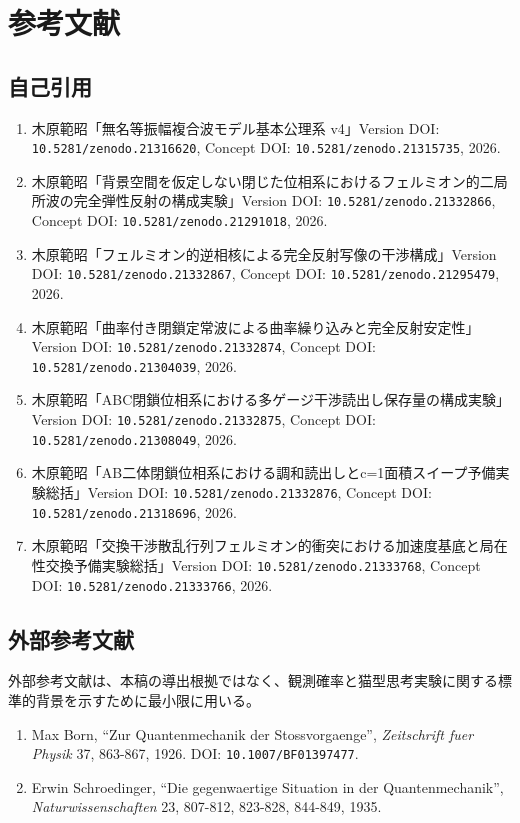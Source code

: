 \documentclass{article}
\providecommand{\tightlist}{\setlength{\itemsep}{0pt}\setlength{\parskip}{0pt}}
\begin{document}
\section{参考文献}\label{ux53c2ux8003ux6587ux732e}

\subsection{自己引用}\label{ux81eaux5df1ux5f15ux7528}

\begin{enumerate}
\def\labelenumi{\arabic{enumi}.}
\tightlist
\item
  木原範昭「無名等振幅複合波モデル基本公理系 v4」Version DOI:
  \texttt{10.5281/zenodo.21316620}, Concept DOI:
  \texttt{10.5281/zenodo.21315735}, 2026.
\item
  木原範昭「背景空間を仮定しない閉じた位相系におけるフェルミオン的二局所波の完全弾性反射の構成実験」Version
  DOI: \texttt{10.5281/zenodo.21332866}, Concept DOI:
  \texttt{10.5281/zenodo.21291018}, 2026.
\item
  木原範昭「フェルミオン的逆相核による完全反射写像の干渉構成」Version
  DOI: \texttt{10.5281/zenodo.21332867}, Concept DOI:
  \texttt{10.5281/zenodo.21295479}, 2026.
\item
  木原範昭「曲率付き閉鎖定常波による曲率繰り込みと完全反射安定性」Version
  DOI: \texttt{10.5281/zenodo.21332874}, Concept DOI:
  \texttt{10.5281/zenodo.21304039}, 2026.
\item
  木原範昭「ABC閉鎖位相系における多ゲージ干渉読出し保存量の構成実験」Version
  DOI: \texttt{10.5281/zenodo.21332875}, Concept DOI:
  \texttt{10.5281/zenodo.21308049}, 2026.
\item
  木原範昭「AB二体閉鎖位相系における調和読出しとc=1面積スイープ予備実験総括」Version
  DOI: \texttt{10.5281/zenodo.21332876}, Concept DOI:
  \texttt{10.5281/zenodo.21318696}, 2026.
\item
  木原範昭「交換干渉散乱行列フェルミオン的衝突における加速度基底と局在性交換予備実験総括」Version
  DOI: \texttt{10.5281/zenodo.21333768}, Concept DOI:
  \texttt{10.5281/zenodo.21333766}, 2026.
\end{enumerate}

\subsection{外部参考文献}\label{ux5916ux90e8ux53c2ux8003ux6587ux732e}

外部参考文献は、本稿の導出根拠ではなく、観測確率と猫型思考実験に関する標準的背景を示すために最小限に用いる。

\begin{enumerate}
\def\labelenumi{\arabic{enumi}.}
\setcounter{enumi}{7}
\tightlist
\item
  Max Born, ``Zur Quantenmechanik der Stossvorgaenge'',
  \emph{Zeitschrift fuer Physik} 37, 863-867, 1926. DOI:
  \texttt{10.1007/BF01397477}.
\item
  Erwin Schroedinger, ``Die gegenwaertige Situation in der
  Quantenmechanik'', \emph{Naturwissenschaften} 23, 807-812, 823-828,
  844-849, 1935.
\end{enumerate}
\end{document}
